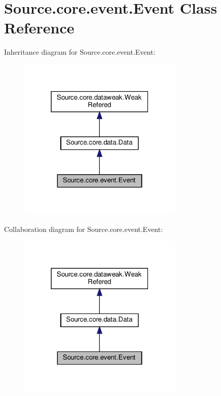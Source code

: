 \hypertarget{classSource_1_1core_1_1event_1_1Event}{}\section{Source.\+core.\+event.\+Event Class Reference}
\label{classSource_1_1core_1_1event_1_1Event}


Inheritance diagram for Source.\+core.\+event.\+Event\+:\nopagebreak
\begin{figure}[H]
\begin{center}
\leavevmode
\includegraphics[width=223pt]{classSource_1_1core_1_1event_1_1Event__inherit__graph}
\end{center}
\end{figure}


Collaboration diagram for Source.\+core.\+event.\+Event\+:\nopagebreak
\begin{figure}[H]
\begin{center}
\leavevmode
\includegraphics[width=223pt]{classSource_1_1core_1_1event_1_1Event__coll__graph}
\end{center}
\end{figure}
